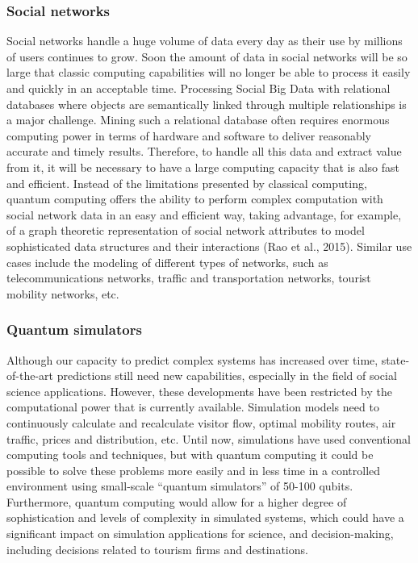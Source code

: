 \documentclass[
  letterpaper,
  DIV=11,
  numbers=noendperiod]{scrreprt}
\begin{document}
\hypertarget{social-networks}{%
\subsubsection{Social networks}\label{social-networks}}

Social networks handle a huge volume of data every day as their use by
millions of users continues to grow. Soon the amount of data in social
networks will be so large that classic computing capabilities will no
longer be able to process it easily and quickly in an acceptable time.
Processing Social Big Data with relational databases where objects are
semantically linked through multiple relationships is a major challenge.
Mining such a relational database often requires enormous computing
power in terms of hardware and software to deliver reasonably accurate
and timely results. Therefore, to handle all this data and extract value
from it, it will be necessary to have a large computing capacity that is
also fast and efficient. Instead of the limitations presented by
classical computing, quantum computing offers the ability to perform
complex computation with social network data in an easy and efficient
way, taking advantage, for example, of a graph theoretic representation
of social network attributes to model sophisticated data structures and
their interactions (Rao et al., 2015). Similar use cases include the
modeling of different types of networks, such as telecommunications
networks, traffic and transportation networks, tourist mobility
networks, etc.

\hypertarget{quantum-simulators}{%
\subsubsection{Quantum simulators}\label{quantum-simulators}}

Although our capacity to predict complex systems has increased over
time, state-of-the-art predictions still need new capabilities,
especially in the field of social science applications. However, these
developments have been restricted by the computational power that is
currently available. Simulation models need to continuously calculate
and recalculate visitor flow, optimal mobility routes, air traffic,
prices and distribution, etc. Until now, simulations have used
conventional computing tools and techniques, but with quantum computing
it could be possible to solve these problems more easily and in less
time in a controlled environment using small-scale ``quantum
simulators'' of 50-100 qubits. Furthermore, quantum computing would
allow for a higher degree of sophistication and levels of complexity in
simulated systems, which could have a significant impact on simulation
applications for science, and decision-making, including decisions
related to tourism firms and destinations.
\end{document}
